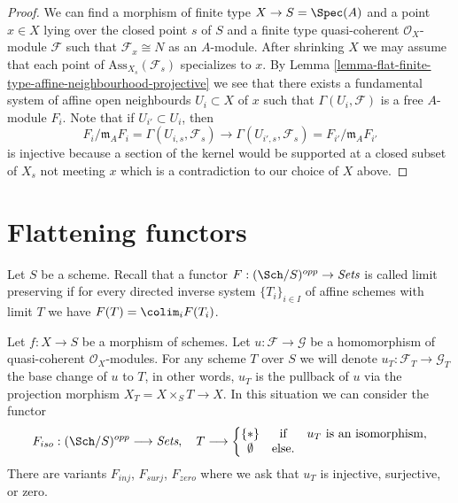 \begin{proof}
We can find a morphism of finite type $X \to S = \Spec(A)$
and a point $x \in X$ lying over the closed point $s$ of $S$ and a finite
type quasi-coherent $\mathcal{O}_X$-module $\mathcal{F}$ such that
$\mathcal{F}_x \cong N$ as an $A$-module. After shrinking $X$
we may assume that each point of $\text{Ass}_{X_s}(\mathcal{F}_s)$ specializes
to $x$. By
Lemma \ref{lemma-flat-finite-type-affine-neighbourhood-projective}
we see that there exists a fundamental system of affine open neighbourds
$U_i \subset X$ of $x$ such that $\Gamma(U_i, \mathcal{F})$ is
a free $A$-module $F_i$. Note that if $U_{i'} \subset U_i$, then
$$
F_i/\mathfrak m_AF_i = \Gamma(U_{i, s}, \mathcal{F}_s)
\longrightarrow
\Gamma(U_{i', s}, \mathcal{F}_s) = F_{i'}/\mathfrak m_AF_{i'}
$$
is injective because a section of the kernel would be supported at
a closed subset of $X_s$ not meeting $x$ which is a contradiction
to our choice of $X$ above.
\end{proof}





\section{Flattening functors}
\label{section-flattening-functors}

\noindent
Let $S$ be a scheme. Recall that a functor
$F : (\Sch/S)^{opp} \to \textit{Sets}$ is called limit preserving
if for every directed inverse system
$\{T_i\}_{i \in I}$ of affine schemes with limit $T$ we have
$F(T) = \colim_i F(T_i)$.

\begin{situation}
\label{situation-iso}
Let $f : X \to S$ be a morphism of schemes.
Let $u : \mathcal{F} \to \mathcal{G}$ be a homomorphism of
quasi-coherent $\mathcal{O}_X$-modules. For any scheme $T$ over
$S$ we will denote $u_T : \mathcal{F}_T \to \mathcal{G}_T$ the
base change of $u$ to $T$, in other words, $u_T$ is the pullback
of $u$ via the projection morphism $X_T = X \times_S T \to X$.
In this situation we can consider the functor
\begin{equation}
\label{equation-iso}
F_{iso} : (\Sch/S)^{opp} \longrightarrow \textit{Sets}, \quad
T \longrightarrow \left\{
\begin{matrix}
\{*\} & \text{if} & u_T \text{ is an isomorphism}, \\
\emptyset & \text{else.} &
\end{matrix}
\right.
\end{equation}
There are variants $F_{inj}$, $F_{surj}$, $F_{zero}$ where we ask that
$u_T$ is injective, surjective, or zero.
\end{situation}

